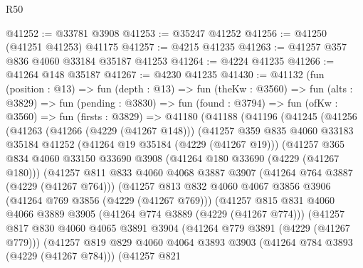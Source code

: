 \begin{lexlean}{R50}
\begin{coremodule}
@41252 := @33781 @3908
@41253 := @35247 @41252
@41256 := @41250 (@41251 @41253) @41175
@41257 := @4215 @41235
@41263 := @41257 @357 @836 @4060 @33184 @35187 @41253
@41264 := @4224 @41235
@41266 := @41264 @148 @35187
@41267 := @4230 @41235
@41430 := @41132
    (fun (position : @13) =>
    fun (depth : @13) =>
    fun (theKw : @3560) =>
    fun (alts : @3829) =>
    fun (pending : @3830) =>
    fun (found : @3794) =>
    fun (ofKw : @3560) =>
    fun (firsts : @3829) =>
    @41180
      (@41188
        (@41196
          (@41245
            (@41256
              (@41263
                (@41266 (@4229 (@41267 @148)))
                (@41257
                  @359
                  @835
                  @4060
                  @33183
                  @35184
                  @41252
                  (@41264 @19 @35184 (@4229 (@41267 @19)))
                  (@41257
                    @365
                    @834
                    @4060
                    @33150
                    @33690
                    @3908
                    (@41264 @180 @33690 (@4229 (@41267 @180)))
                    (@41257
                      @811
                      @833
                      @4060
                      @4068
                      @3887
                      @3907
                      (@41264 @764 @3887 (@4229 (@41267 @764)))
                      (@41257
                        @813
                        @832
                        @4060
                        @4067
                        @3856
                        @3906
                        (@41264 @769 @3856 (@4229 (@41267 @769)))
                        (@41257
                          @815
                          @831
                          @4060
                          @4066
                          @3889
                          @3905
                          (@41264 @774 @3889 (@4229 (@41267 @774)))
                          (@41257
                            @817
                            @830
                            @4060
                            @4065
                            @3891
                            @3904
                            (@41264 @779 @3891 (@4229 (@41267 @779)))
                            (@41257
                              @819
                              @829
                              @4060
                              @4064
                              @3893
                              @3903
                              (@41264 @784 @3893 (@4229 (@41267 @784)))
                              (@41257
                                @821

\end{coremodule}
\end{lexlean}
